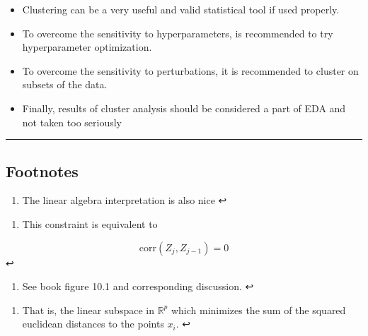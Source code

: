 \documentclass[11pt]{article}
\providecommand{\tightlist}{%
      \setlength{\itemsep}{0pt}\setlength{\parskip}{0pt}}
\begin{document}
    \begin{itemize}
\tightlist
\item
  Clustering can be a very useful and valid statistical tool if used
  properly.
\item
  To overcome the sensitivity to hyperparameters, is recommended to try
  hyperparameter optimization.
\item
  To overcome the sensitivity to perturbations, it is recommended to
  cluster on subsets of the data.
\item
  Finally, results of cluster analysis should be considered a part of
  EDA and not taken too seriously
\end{itemize}

    \begin{center}\rule{0.5\linewidth}{\linethickness}\end{center}

\hypertarget{footnotes}{%
\subsection{Footnotes}\label{footnotes}}

    \hypertarget{foot85}{}
\begin{enumerate}
\def\labelenumi{\arabic{enumi}.}
\setcounter{enumi}{84}
\tightlist
\item
  The linear algebra interpretation is also nice ↩
\end{enumerate}

\hypertarget{foot86}{}
\begin{enumerate}
\def\labelenumi{\arabic{enumi}.}
\setcounter{enumi}{85}
\tightlist
\item
  This constraint is equivalent to
\end{enumerate}

\[\text{corr}(Z_j, Z_{j-1}) = 0\] ↩

\hypertarget{foot87}{}
\begin{enumerate}
\def\labelenumi{\arabic{enumi}.}
\setcounter{enumi}{86}
\tightlist
\item
  See book figure 10.1 and corresponding discussion. ↩
\end{enumerate}

\hypertarget{foot88}{}
\begin{enumerate}
\def\labelenumi{\arabic{enumi}.}
\setcounter{enumi}{87}
\tightlist
\item
  That is, the linear subspace in \(\mathbb{R}^p\) which minimizes the
  sum of the squared euclidean distances to the points \(x_i\). ↩
\end{enumerate}
\end{document}
